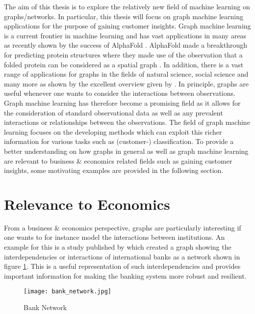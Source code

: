 	
	The aim of this thesis is to explore the relatively new field of machine
	learning on graphs/networks. In particular, this thesis will focus on graph 
	machine learning applications for the purpose of gaining customer insights. 
	Graph machine learning is a current frontier in machine learning and has vast
	applications in many areas as recently shown by the success of AlphaFold
	\citep{senior2020improved}. AlphaFold made a breakthrough for predicting
	protein structures where they made use of the observation that a folded
	protein can be considered as a spatial graph \citep{AlphaFoldTeam2020}. In
	addition, there is a vast range of applications for graphs in the fields of 
	natural science, social science and many more as shown by the excellent 
	overview given by \cite{zhou2020graph}. In principle, graphs are useful 
	whenever one wants to consider the interactions between observations. Graph
	machine learning has therefore become a promising field as it allows for
	the consideration of standard observational data as well as any prevalent
	interactions or relationships between the observations. The field of graph 
	machine learning focuses on the developing methods which can exploit this 
	richer information for various tasks such as (customer-) classification. To
	provide a better understanding on how graphs in general as well as graph
	machine learning are relevant to business \& economics related fields such
	as gaining customer insights, some motivating examples are provided in the
	following section.

	\section{Relevance to Economics}

	\noindent From a business \& economics perspective, graphs are particularly
	interesting if one wants to for instance model the interactions between
	institutions. An example for this is a study published by
	\cite{schweitzer2009economic} which created a graph showing the 
	interdependencies or interactions of international banks as a network shown 
	in figure \ref{fig:bank_network}. This is a useful representation of 
	such interdependencies and provides important information for making the
	banking system more robust and resilient. 

	\begin{figure}[h]
		\centering
		\texttt{[image: bank\_network.jpg]}
		\caption{Bank Network}
		\cite[p. 424]{schweitzer2009economic}
		\label{fig:bank_network}
	\end{figure} 

